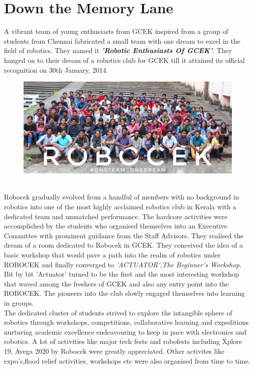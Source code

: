 \section{Down the Memory Lane}
\justify
A vibrant team of young enthusiasts from GCEK inspired from a group of students from Chennai fabricated a small team with one dream to excel in the field of robotics. They named it \textit{\textbf{'Robotic Enthusiasts Of GCEK'}}. They hanged on to their dream of a robotics club for GCEK till it attained its official recognition on 30th January, 2014.
\begin{figure}
    \centering
    \includegraphics{Images/robocek.jpeg}
\end{figure}\\
Robocek gradually evolved from a handful of members with no background in robotics into one of the most highly acclaimed robotics club in Kerala with a dedicated team and unmatched performance. The hardcore activities were accomplished by the students who organised themselves into an Executive Committee with prominent guidance from the Staff Advisors. They realised the dream of a room dedicated to Robocek in GCEK. They conceived the idea of a basic workshop that would pave a path into the realm of robotics under ROBOCEK and finally converged to \textit{'ACTUATOR',The Beginner's Workshop}. Bit by bit 'Actuator' turned to be the first and the most interesting workshop that waved among the freshers of GCEK and also any entry point into the ROBOCEK. The pioneers into the club slowly engaged themselves into learning in groups.\\
The dedicated cluster of students strived to explore the intangible sphere of robotics through workshops, competitions, collaborative learning and expeditions nurturing academic excellence endeavouring to keep in pace with electronics and robotics. A lot of activities like major tech fests and robofests including Xplore 19, Avega 2020 by Robocek were greatly appreciated. Other activites like expo's,flood relief activities, workshops etc were also organised from time to time. 